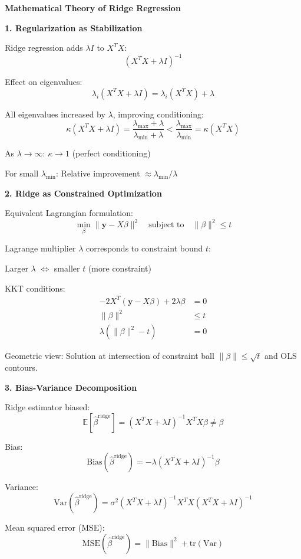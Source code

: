 \documentclass[12pt]{article}
\begin{document}
\begin{explanation}

\textbf{Mathematical Theory of Ridge Regression}

\textbf{1. Regularization as Stabilization}

Ridge regression adds $\lambda I$ to $X^TX$:
\[(X^TX + \lambda I)^{-1}\]

Effect on eigenvalues:
\[\lambda_i(X^TX + \lambda I) = \lambda_i(X^TX) + \lambda\]

All eigenvalues increased by $\lambda$, improving conditioning:
\[\kappa(X^TX + \lambda I) = \frac{\lambda_{\max} + \lambda}{\lambda_{\min} + \lambda} < \frac{\lambda_{\max}}{\lambda_{\min}} = \kappa(X^TX)\]

As $\lambda \to \infty$: $\kappa \to 1$ (perfect conditioning)

For small $\lambda_{\min}$: Relative improvement $\approx \lambda_{\min}/\lambda$

\textbf{2. Ridge as Constrained Optimization}

Equivalent Lagrangian formulation:
\[\min_{\beta} \|\mathbf{y} - X\beta\|^2 \quad \text{subject to} \quad \|\beta\|^2 \leq t\]

Lagrange multiplier $\lambda$ corresponds to constraint bound $t$:

Larger $\lambda$ $\Leftrightarrow$ smaller $t$ (more constraint)

KKT conditions:
\begin{align*}
-2X^T(\mathbf{y} - X\beta) + 2\lambda\beta &= 0 \\
\|\beta\|^2 &\leq t \\
\lambda(\|\beta\|^2 - t) &= 0
\end{align*}

Geometric view: Solution at intersection of constraint ball $\|\beta\| \leq \sqrt{t}$ and OLS contours.

\textbf{3. Bias-Variance Decomposition}

Ridge estimator biased:
\[\mathbb{E}[\hat{\beta}^{\text{ridge}}] = (X^TX + \lambda I)^{-1}X^TX\beta \neq \beta\]

Bias:
\[\text{Bias}(\hat{\beta}^{\text{ridge}}) = -\lambda(X^TX + \lambda I)^{-1}\beta\]

Variance:
\[\text{Var}(\hat{\beta}^{\text{ridge}}) = \sigma^2(X^TX + \lambda I)^{-1}X^TX(X^TX + \lambda I)^{-1}\]

Mean squared error (MSE):
\[\text{MSE}(\hat{\beta}^{\text{ridge}}) = \|\text{Bias}\|^2 + \text{tr}(\text{Var})\]


\end{explanation}
\end{document}
